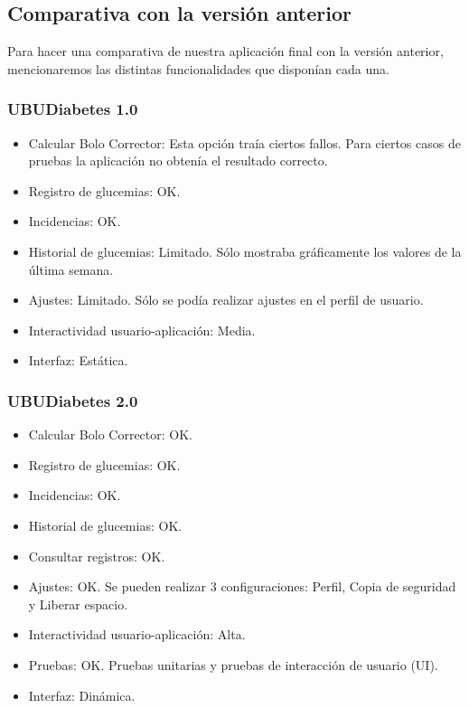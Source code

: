 \subsection{Comparativa con la versión anterior}
Para hacer una comparativa de nuestra aplicación final con la versión anterior, mencionaremos las distintas funcionalidades que disponían cada una.
\subsubsection{UBUDiabetes 1.0}
\begin{itemize}
	\item Calcular Bolo Corrector: Esta opción traía ciertos \textcolor{RedTxt}{fallos}. Para ciertos casos de pruebas la aplicación no obtenía el resultado correcto.
	\item Registro de glucemias: \textcolor{GreenTxt}{OK}.
	\item Incidencias: \textcolor{GreenTxt}{OK}.
	\item Historial de glucemias: \textcolor{OrangeTxt}{Limitado}. Sólo mostraba gráficamente los valores de la última semana.
	\item Ajustes: \textcolor{OrangeTxt}{Limitado}. Sólo se podía realizar ajustes en el perfil de usuario.
	\item Interactividad usuario-aplicación: \textcolor{OrangeTxt}{Media}.
	\item Interfaz: Estática.
\end{itemize}
\subsubsection{UBUDiabetes 2.0}
\begin{itemize}
	\item Calcular Bolo Corrector: \textcolor{GreenTxt}{OK}.
	\item Registro de glucemias: \textcolor{GreenTxt}{OK}.
	\item Incidencias: \textcolor{GreenTxt}{OK}.
	\item Historial de glucemias: \textcolor{GreenTxt}{OK}.
	\item Consultar registros: \textcolor{GreenTxt}{OK}.
	\item Ajustes: \textcolor{GreenTxt}{OK}. Se pueden realizar 3 configuraciones: Perfil, Copia de seguridad y Liberar espacio.
	\item Interactividad usuario-aplicación: \textcolor{GreenTxt}{Alta}.
	\item Pruebas: \textcolor{GreenTxt}{OK}. Pruebas unitarias y pruebas de interacción de usuario (UI).
	\item Interfaz: Dinámica.
\end{itemize}
